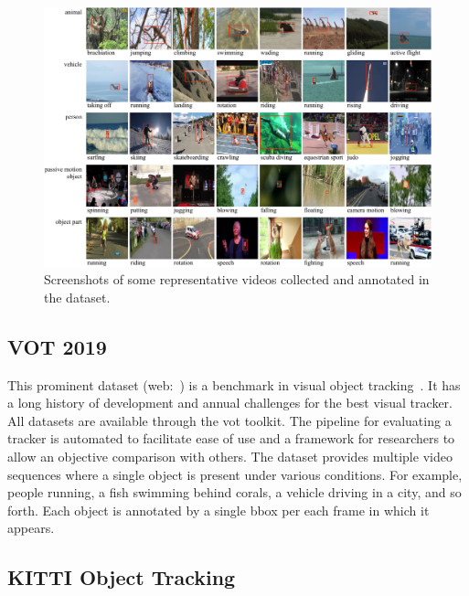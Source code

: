 \begin{figure}[t]
    \centerline{\includegraphics[width=\linewidth]{figures/datasets/got10k_sample.pdf}}
    \caption[ dataset]{Screenshots of some representative videos collected and annotated in the  dataset. }
    \label{fig:DatasetGOT10k}
\end{figure}

\subsection{VOT 2019}
\label{ssec:DatasetVOT2019}


This prominent dataset (web:~\cite{webvot2019dataset}) is a benchmark in visual object tracking~\cite{kristan2019motyolovot19}. It has a long history of development and annual challenges for the best visual tracker. All  datasets are available through the \gls{vot} toolkit. The pipeline for evaluating a tracker is automated to facilitate ease of use and a framework for researchers to allow an objective comparison with others. The dataset provides multiple video sequences where a single object is present under various conditions. For example, people running, a fish swimming behind corals, a vehicle driving in a city, and so forth. Each object is annotated by a single \gls{bbox} per each frame in which it appears.

\subsection{KITTI Object Tracking}
\label{ssec:DatasetKITTIObjectTracking}

